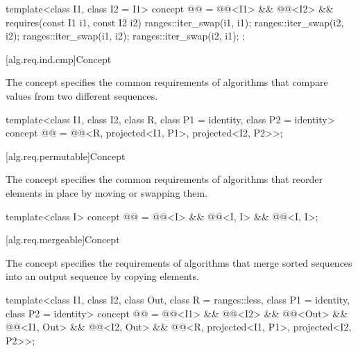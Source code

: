 \begin{codeblock}
template<class I1, class I2 = I1>
  concept @@ =
    @@<I1> && @@<I2> &&
    requires(const I1 i1, const I2 i2) {
      ranges::iter_swap(i1, i1);
      ranges::iter_swap(i2, i2);
      ranges::iter_swap(i1, i2);
      ranges::iter_swap(i2, i1);
    };
\end{codeblock}

[alg.req.ind.cmp]{Concept }

\pnum
The  concept specifies
the common requirements of algorithms that
compare values from two different sequences.

\begin{codeblock}
template<class I1, class I2, class R, class P1 = identity,
         class P2 = identity>
  concept @@ =
    @@<R, projected<I1, P1>, projected<I2, P2>>;
\end{codeblock}

[alg.req.permutable]{Concept }

\pnum
The  concept specifies the common requirements
of algorithms that reorder elements in place by moving or swapping them.

\begin{codeblock}
template<class I>
  concept @@ =
    @@<I> &&
    @@<I, I> &&
    @@<I, I>;
\end{codeblock}

[alg.req.mergeable]{Concept }

\pnum
The  concept specifies the requirements of algorithms
that merge sorted sequences into an output sequence by copying elements.

\begin{codeblock}
template<class I1, class I2, class Out, class R = ranges::less,
         class P1 = identity, class P2 = identity>
  concept @@ =
    @@<I1> &&
    @@<I2> &&
    @@<Out> &&
    @@<I1, Out> &&
    @@<I2, Out> &&
    @@<R, projected<I1, P1>, projected<I2, P2>>;
\end{codeblock}

